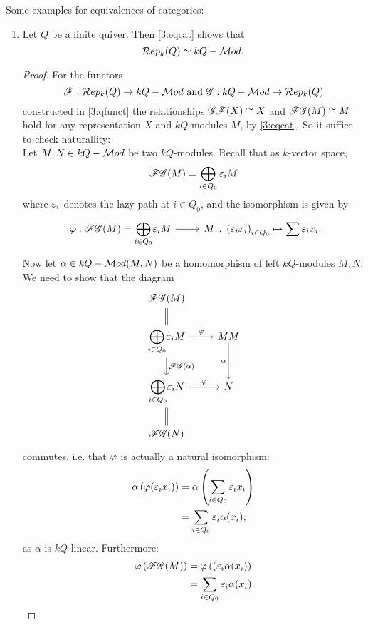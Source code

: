 \begin{bsp}
  Some examples for equivalences of categories:
  \begin{enumerate}
    \item Let $Q$ be a finite quiver. Then \cref{3:eqcat} shows that
    \[
    \mathcal{R}ep_k(Q)\simeq kQ-\mathcal{M}od.\]\coms
    \begin{proof}
        For the functors
        \[
        \mathscr{F}: \mathcal{R}ep_k(Q)\to kQ-\mathcal{M}od\text{ and }\mathscr{G}:kQ-\mathcal{M}od\to \mathcal{R}ep_k(Q)
        \]
        constructed in \cref{3:qfunct} the relationships $\mathscr{G}\mathscr{F}(X)\cong X$ and $\mathscr{F}\mathscr{G}(M)\cong M$ hold for any representation $X$ and $kQ$-modules $M$, by \cref{3:eqcat}. So it suffice to check naturallity:\\
        Let $M,N\in kQ-\mathcal{M}od$ be two $kQ$-modules. Recall that as $k$-vector space,
        \[
        \mathscr{F}\mathscr{G}(M) = \bigoplus_{i\in Q_0}\varepsilon_iM\]
        where $\varepsilon_i$ denotes the lazy path at $i\in Q_0$, and the isomorphism is given by
        \[
        \begin{tikzcd}
        \pphi:\ffunc\gfunc(M)={\displaystyle\bigoplus_{i\in Q_0}}\eepsilon_iM\ar{r}& M\end{tikzcd},~\left(\eepsilon_ix_i\right)_{i\in Q_0}\mapsto \sum \eepsilon_ix_i.
        \]
        Now let $\alpha\in kQ-\mathcal{M}od(M,N)$ be a homomorphism of left $kQ$-modules $M,N$. We need to show that the diagram
        \[
        \begin{tikzcd}
          \ffunc\gfunc(M)\ar[equal]{d}&\\
          {\displaystyle \bigoplus_{i\in Q_0}}\eepsilon_iM\ar{r}{\pphi}\ar{d}{\ffunc\gfunc(\alpha)}& M\ar[swap]{d}{\alpha}M\\
          {\displaystyle \bigoplus_{i\in Q_0}}\eepsilon_iN\ar{r}{\pphi}&N\\
          \ffunc\gfunc(N)\ar[equal]{u}&
        \end{tikzcd}
        \] commutes, i.e. that $\varphi$ is actually a natural isomorphism:
        \begin{align*}
          \alpha\left(\varphi(\varepsilon_ix_i)\right)&= \alpha\left(\sum_{i\in Q_0}\varepsilon_ix_i\right)\\
          &= \sum_{i\in Q_0}\varepsilon_i \alpha(x_i),
        \end{align*}
        as $\alpha$ is $kQ$-linear. Furthermore:
        \begin{align*}
          \pphi\left(\ffunc\gfunc(M)\right) &= \pphi\left((\eepsilon_i\alpha(x_i)\right)\\
          &= \sum_{i\in Q_0}\eepsilon_i\alpha(x_i)

\end{align*}
\end{proof}
\end{enumerate}
\end{bsp}
